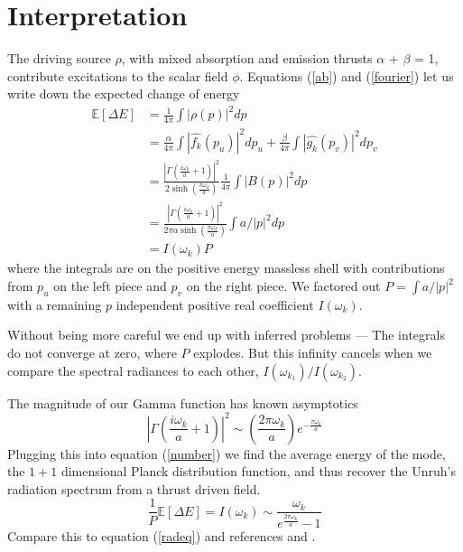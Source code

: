 \documentclass[12pt,a4paper]{article}
\begin{document}
\section{Interpretation}
The driving source $\rho$, with mixed absorption and emission thrusts $\alpha$ + $\beta$ = 1, contribute excitations to the scalar field $\phi$. Equations (\ref{ab}) and (\ref{fourier}) let us write down the expected change of energy
\begin{equation}  
  \label{number}
  \begin{split}
    \mathbb{E}[\Delta E] &= \frac{1}{4\pi} \int{|\rho(p)|^2 dp} \\
    &= \frac{\alpha}{4\pi} \int{\left|\widehat{f_k}(p_u)\right|^2 dp_u} + \frac{\beta}{4\pi}\int{\left|\widehat{g_k}(p_v)\right|^2dp_v} \\
    &= \frac{\left|\Gamma\left(\frac{i\omega_k}{a} + 1\right)\right|^2}{2 \sinh \left({\frac{\pi\omega_k}{a}}\right)} \frac{1}{4\pi} \int{{\left|B(p)\right|^2} dp} \\
    &=  \frac{\left|\Gamma\left(\frac{i\omega_k}{a} + 1\right)\right|^2}{2 \pi a \sinh \left({\frac{\pi\omega_k}{a}}\right)} \int{a/|p|^2 dp}\\  
&=I(\omega_k) P
  \end{split}
\end{equation}
where the integrals are on the positive energy massless shell with contributions from $p_u$ on the left piece and $p_v$ on the right piece.  We factored out $P = \int{a/|p|^2}$ with a remaining $p$ independent positive real coefficient $I(\omega_k)$.

Without being more careful we end up with inferred problems --- The integrals do not converge at zero, where $P$ explodes.  But this infinity cancels when we compare the spectral radiances to each other, $I(\omega_{k_1}) / I(\omega_{k_2})$.

The magnitude of our Gamma function has known asymptotics \cite[Eq.~5.11.9]{NIST:DLMF}
\begin{equation}
\left|\Gamma\left(\frac{i\omega_k}{a} + 1\right) \right|^2 \sim \left(\frac{2 \pi \omega_k} {a}\right) e^{-\frac{\pi\omega_k}{a}}
\end{equation}
Plugging this into equation (\ref{number}) we find the average energy of the mode, the $1+1$ dimensional Planck distribution function, and thus recover the Unruh's radiation spectrum from a thrust driven field.
\begin{equation}
\frac{1}{P} \mathbb{E}[\Delta E] = I(\omega_k) \sim \frac{\omega_k}{e^{\frac{2 \pi \omega_k}{a}}-1}
\end{equation}
Compare this to equation (\ref{radeq}) and references \cite{unruh} and \cite{Frodden}.
\end{document}
